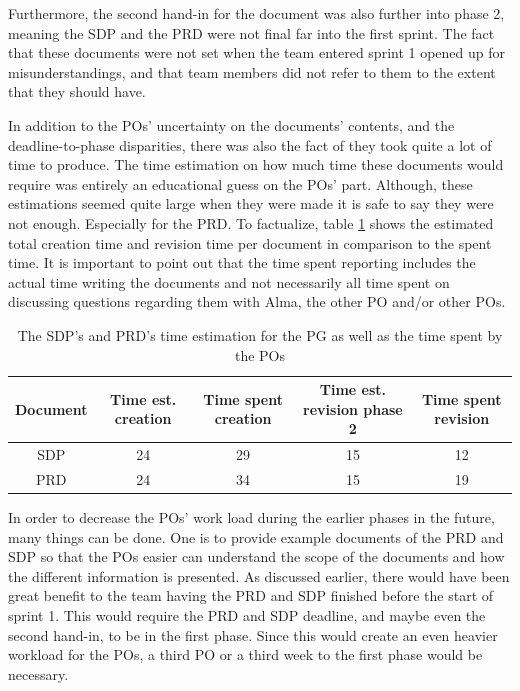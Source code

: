 \documentclass{article}
\begin{document}
Furthermore, the second hand-in for the document was also further into phase 2, meaning the SDP and the PRD were not final far into the first sprint. The fact that these documents were not set when the team entered sprint 1 opened up for misunderstandings, and that team members did not refer to them to the extent that they should have. 

In addition to the POs' uncertainty on the documents' contents, and the deadline-to-phase disparities, there was also the fact of they took quite a lot of time to produce. The time estimation on how much time these documents would require was entirely an educational guess on the POs' part. Although, these estimations seemed quite large when they were made it is safe to say they were not enough. Especially for the PRD. To factualize, table \ref{tab:timeDocs} shows the estimated total creation time and revision time per document in comparison to the spent time. It is important to point out that the time spent reporting includes the actual time writing the documents and not necessarily all time spent on discussing questions regarding them with Alma, the other PO and/or other POs.    
\begin{table}[h!]
    \centering
    \begin{tabular}{|c|c|c|c|c|}
    \hline
      Document & Time est. creation & Time spent creation  & Time est. revision phase 2 & Time spent revision \\
      \hline \hline
      SDP & 24 & 29 & 15 & 12 \\ \hline
      PRD & 24 & 34 & 15 & 19 \\ \hline
    \end{tabular}
    \caption{The SDP's and PRD's time estimation for the PG as well as the time spent by the POs}
    \label{tab:timeDocs}
\end{table}

In order to decrease the POs' work load during the earlier phases in the future, many things can be done. One is to provide example documents of the PRD and SDP so that the POs easier can understand the scope of the documents and how the different information is presented. As discussed earlier, there would have been great benefit to the team having the PRD and SDP finished before the start of sprint 1. This would require the PRD and SDP deadline, and maybe even the second hand-in, to be in the first phase. Since this would create an even heavier workload for the POs, a third PO or a third week to the first phase would be necessary. 
\end{document}
